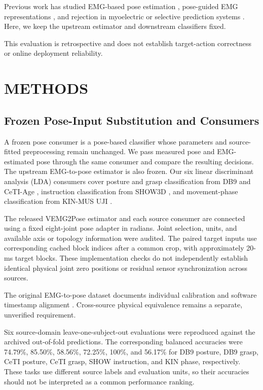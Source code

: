 Previous work has studied EMG-based pose estimation \cite{salter2024emg2pose}, pose-guided EMG representations \cite{cui2025cpep,cui2026embridge}, and rejection in myoelectric or selective prediction systems \cite{scheme2013confidence,ahkami2023rejection,geifman2019selectivenet}. Here, we keep the upstream estimator and downstream classifiers fixed.

This evaluation is retrospective and does not establish target-action correctness or online deployment reliability.

\section{METHODS}\label{methods}


\subsection{Frozen Pose-Input Substitution and Consumers}\label{frozen-pose-input-substitution-and-consumers}
A frozen pose consumer is a pose-based classifier whose parameters and source-fitted preprocessing remain unchanged. We pass measured pose and EMG-estimated pose through the same consumer and compare the resulting decisions. The upstream EMG-to-pose estimator is also frozen. Our six linear discriminant analysis (LDA) consumers cover posture and grasp classification from DB9 \cite{jarquebou2020db9} and CeTI-Age \cite{muschter2023ceti}, instruction classification from SHOW3D \cite{rim2026show3d}, and movement-phase classification from KIN-MUS UJI \cite{jarquebou2019kinmus}.

The released VEMG2Pose estimator \cite{salter2024emg2pose} and each source consumer are connected using a fixed eight-joint pose adapter in radians. Joint selection, units, and available axis or topology information were audited. The paired target inputs use corresponding cached block indices after a common crop, with approximately 20-ms target blocks. These implementation checks do not independently establish identical physical joint zero positions or residual sensor synchronization across sources.

The original EMG-to-pose dataset documents individual calibration and software timestamp alignment \cite{salter2024emg2pose}. Cross-source physical equivalence remains a separate, unverified requirement.

Six source-domain leave-one-subject-out evaluations were reproduced against the archived out-of-fold predictions. The corresponding balanced accuracies were 74.79\%, 85.50\%, 58.56\%, 72.25\%, 100\%, and 56.17\% for DB9 posture, DB9 grasp, CeTI posture, CeTI grasp, SHOW instruction, and KIN phase, respectively. These tasks use different source labels and evaluation units, so their accuracies should not be interpreted as a common performance ranking.

